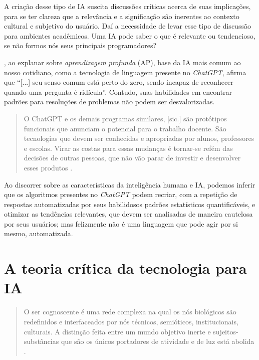 \documentclass[portuguese]{textolivre}
\begin{document}
A criação desse tipo de IA suscita discussões críticas acerca de suas implicações, para se ter clareza que a relevância e a significação são inerentes ao contexto cultural e subjetivo do usuário. Daí a necessidade de levar esse tipo de discussão para ambientes acadêmicos. Uma IA pode saber o que é relevante ou tendencioso, se não formos nós seus principais programadores?

\textcite[p. 175]{santaella2023inteligencia}, ao explanar sobre \emph{aprendizagem profunda} (AP), base da IA mais comum ao nosso cotidiano, como a tecnologia de linguagem presente no \emph{ChatGPT}, afirma que “[...] seu senso comum está perto do zero, sendo incapaz de reconhecer quando uma pergunta é ridícula”. Contudo, suas habilidades em encontrar padrões para resoluções de problemas não podem ser desvalorizadas.

\begin{quote}
    O ChatGPT e os demais programas similares, [sic.] são protótipos funcionais que anunciam o potencial para o trabalho docente. São tecnologias que devem ser conhecidas e apropriadas por alunos, professores e escolas. Virar as costas para essas mudanças é tornar-se refém das decisões de outras pessoas, que não vão parar de investir e desenvolver esses produtos \cite[p. 6]{baltar2023professores}.
\end{quote}

Ao discorrer sobre as características da inteligência humana e IA, podemos inferir que os algoritmos presentes no \emph{ChatGPT} podem recriar, com a repetição de respostas automatizadas por seus habilidosos padrões estatísticos quantificáveis, e otimizar as tendências relevantes, que devem ser analisadas de maneira cautelosa por seus usuários; mas felizmente não é uma linguagem que pode agir por si mesmo, automatizada. 


\section{A teoria crítica da tecnologia para IA}

\begin{quote}
    O ser cognoscente é uma rede complexa na qual os nós biológicos são redefinidos e interfaceados por nós técnicos, semióticos, institucionais, culturais. A distinção feita entre um mundo objetivo inerte e sujeitos-substâncias que são os únicos portadores de atividade e de luz está abolida \cite[p. 98]{levy1993tecnologias}. 
\end{quote}
\end{document}
